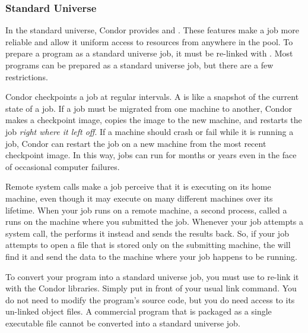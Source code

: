\subsubsection{\label{sec:standard-universe}Standard Universe}

In the standard universe, Condor provides  and
.  These features make a job more reliable
and allow it uniform access to resources from anywhere in the pool.
To prepare a program as a standard universe job, it must be re-linked
with .  Most programs can be prepared as a standard
universe job, but there are a few restrictions.

Condor checkpoints a job at regular intervals.
A  is like a snapshot of the current
state of a job.  If a job must be migrated from one machine to another,
Condor makes a checkpoint image, copies the image to the new machine,
and restarts the job \emph{right where it left off}.  If a machine should
crash or fail while it is running a job, Condor can restart the job on
a new machine from the most recent checkpoint image.  In this way, jobs
can run for months or years even in the face of occasional computer failures.

Remote system calls make a job perceive that it is executing on its home
machine, even though it may execute on many different machines over its
lifetime.  When your job runs on a remote machine, a second process, called
a  runs on the machine where you submitted the job.
Whenever your job attempts a system call, the  performs
it instead and sends the results back.  So, if your job attempts to
open a file that is stored only on the submitting machine,
the  will find it and send the data to the machine where
your job happens to be running.

To convert your program into a standard universe job, you must use
 to re-link it with the Condor libraries.  Simply
put  in front of your usual link command.
You do not need to modify the program's source code,
but you do need access to its un-linked object files.  A commercial
program that is packaged as a single executable file cannot be
converted into a standard universe job.

